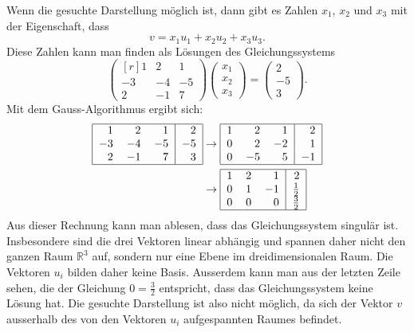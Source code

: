 \begin{loesung}
Wenn die gesuchte Darstellung möglich ist, dann gibt es Zahlen
$x_1$, $x_2$ und $x_3$ mit der Eigenschaft, dass
\[
v =x_1u_1+x_2u_2+x_3u_3.
\]
Diese Zahlen kann man finden als Lösungen des Gleichungssystems
\[
\begin{pmatrix*}[r]
1 & 2 & 1\\
-3 & -4 & -5\\
2 & -1 & 7
\end{pmatrix*}
\begin{pmatrix}
x_1\\x_2\\x_3
\end{pmatrix}
=
\begin{pmatrix}
2\\-5\\3
\end{pmatrix}.
\]
Mit dem Gauss-Algorithmus ergibt sich:
\begin{align*}
\begin{tabular}{|rrr|r|}
\hline
1&2&1&2\\
$-3$&$-4$&$-5$&$-5$\\
2&$-1$&7&3\\
\hline
\end{tabular}
&\rightarrow
\begin{tabular}{|rrr|r|}
\hline
1&2&1&2\\
0&2&$-2$&1\\
0&$-5$&5&$-1$\\
\hline
\end{tabular}
\\
&\rightarrow
\begin{tabular}{|rrr|r|}
\hline
1&2&1&2\\
0&1&$-1$&$\frac12$\\
0&0&0&$\frac32$\\
\hline
\end{tabular}
\end{align*}
Aus dieser Rechnung kann man ablesen, dass das Gleichungssystem singulär
ist. Insbesondere sind die drei Vektoren linear abhängig und spannen daher
nicht den ganzen Raum $\mathbb{R}^3$ auf, sondern nur eine Ebene im dreidimensionalen 
Raum. Die Vektoren $u_i$ bilden daher keine Basis. 
Ausserdem kann man aus der letzten Zeile sehen, die der
Gleichung $0=\frac32$ entspricht, dass das Gleichungssystem
keine Lösung hat. Die gesuchte Darstellung ist also nicht möglich, da sich der Vektor $v$
ausserhalb des von den Vektoren $u_i$ aufgespannten Raumes befindet.
\end{loesung}

